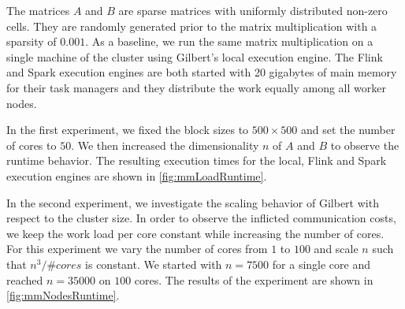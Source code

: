 The matrices $A$ and $B$ are sparse matrices with uniformly distributed non-zero cells.
They are randomly generated prior to the matrix multiplication with a sparsity of $0.001$.
As a baseline, we run the same matrix multiplication on a single machine of the cluster using Gilbert's local execution engine.
The Flink and Spark execution engines are both started with 20 gigabytes of main memory for their task managers and they distribute the work equally among all worker nodes.

In the first experiment, we fixed the block sizes to $500 \times 500$ and set the number of cores to $50$.
We then increased the dimensionality $n$ of $A$ and $B$ to observe the runtime behavior.
The resulting execution times for the local, Flink and Spark execution engines are shown in \cref{fig:mmLoadRuntime}.

In the second experiment, we investigate the scaling behavior of Gilbert with respect to the cluster size.
In order to observe the inflicted communication costs, we keep the work load per core constant while increasing the number of cores.
For this experiment we vary the number of cores from $1$ to $100$ and scale $n$ such that $n^3/\#cores$ is constant.
We started with $n=7500$ for a single core and reached $n=35000$ on $100$ cores.
The results of the experiment are shown in \cref{fig:mmNodesRuntime}.

